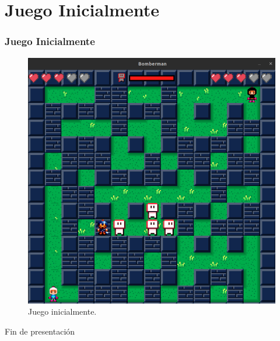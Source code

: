 \documentclass{beamer}
\begin{document}
\section{Juego Inicialmente}
\begin{frame}
\frametitle{Juego Inicialmente}
\begin{figure}[H]
	\centering
	\includegraphics[scale=0.25]{assets/juegoinicia.png}
    \caption{Juego inicialmente.}
    \label{fig:juego inicialmente}
\end{figure}
\end{frame}

\begin{frame}
\Huge{\centerline{Fin de presentación}}
\end{frame}
\end{document}
